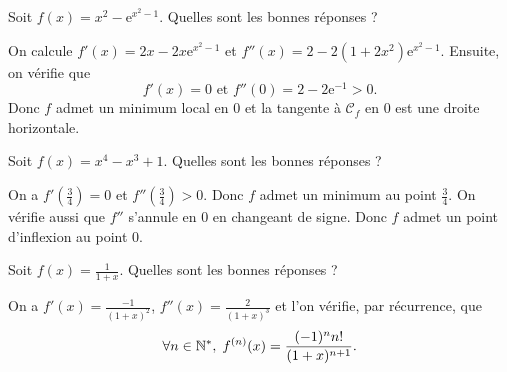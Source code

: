 \begin{question}
Soit $\displaystyle f(x)=x^2-\mathrm{e}^{x^2-1}$. Quelles sont les bonnes réponses ?
\begin{answers}  
\end{answers}
\begin{explanations}
On calcule $f'(x)=2x-2x\mathrm{e}^{x^2-1}$ et $f''(x)=2-2(1+2x^2)\mathrm{e}^{x^2-1}$. Ensuite, on vérifie que
$$f'(x)=0\mbox{ et }f''(0)=2-2\mathrm{e}^{-1}>0.$$
Donc $f$ admet un minimum local en $0$ et la tangente à $\mathscr{C}_f$ en $0$ est une droite horizontale.
\end{explanations}
\end{question}



\begin{question}
Soit $\displaystyle f(x)=x^4-x^3+1$. Quelles sont les bonnes réponses ?
\begin{answers}  
\end{answers}
\begin{explanations}
On a $f'\left(\frac{3}{4}\right)=0$ et $f''\left(\frac{3}{4}\right)>0$. Donc $f$ admet un minimum au point $\displaystyle \frac{3}{4}$. On vérifie aussi que $f''$ s'annule en $0$ en changeant de signe. Donc $f$ admet un point d'inflexion au point $0$.
\end{explanations}
\end{question}




\begin{question}
Soit $\displaystyle f(x)=\frac{1}{1+x}$. Quelles sont les bonnes réponses ?
\begin{answers}  
\end{answers}
\begin{explanations}
On a $\displaystyle f'(x)=\frac{-1}{(1+x)^2}$, $\displaystyle f''(x)=\frac{2}{(1+x)^3}$ et l'on vérifie, par récurrence, que
$$\forall n\in \mathbb{N}^*,\; f^{(n)}(x)=\frac{(-1)^nn!}{(1+x)^{n+1}}.$$
\end{explanations}
\end{question}




